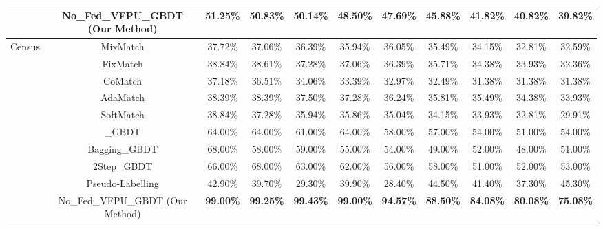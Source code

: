 \begin{table}[h]
{{\begin{tabular}{ccccccccccc}
				& No\_Fed\_VFPU\_GBDT (Our Method) & \textbf{51.25\%} & \textbf{50.83\%} & \textbf{50.14\%} & \textbf{48.50\%} & \textbf{47.69\%} & \textbf{45.88\%} & \textbf{41.82\%} & \textbf{40.82\%} & \textbf{39.82\%}  \\ 
				\hline
				\multirow{10}{*}{Census} & MixMatch                         & 37.72\%          & 37.06\%          & 36.39\%          & 35.94\%          & 36.05\%          & 35.49\%          & 34.15\%          & 32.81\%          & 32.59\%           \\
				& FixMatch                         & 38.84\%          & 38.61\%          & 37.28\%          & 37.06\%          & 36.39\%          & 35.71\%          & 34.38\%          & 33.93\%          & 32.36\%           \\
				& CoMatch                          & 37.18\%          & 36.51\%          & 34.06\%          & 33.39\%          & 32.97\%          & 32.49\%          & 31.38\%          & 31.38\%          & 31.38\%           \\
				& AdaMatch                         & 38.39\%          & 38.39\%          & 37.50\%          & 37.28\%          & 36.24\%          & 35.81\%          & 35.49\%          & 34.38\%          & 33.93\%           \\
				& SoftMatch                        & 38.84\%          & 37.28\%          & 35.94\%          & 35.86\%          & 35.04\%          & 34.15\%          & 33.93\%          & 32.81\%          & 29.91\%           \\
				& \_GBDT                           & 64.00\%          & 64.00\%          & 61.00\%          & 64.00\%          & 58.00\%          & 57.00\%          & 54.00\%          & 51.00\%          & 54.00\%           \\
				& Bagging\_GBDT                    & 68.00\%          & 58.00\%          & 59.00\%          & 55.00\%          & 54.00\%          & 49.00\%          & 52.00\%          & 48.00\%          & 51.00\%           \\
				& 2Step\_GBDT                      & 66.00\%          & 68.00\%          & 63.00\%          & 62.00\%          & 56.00\%          & 58.00\%          & 51.00\%          & 52.00\%          & 53.00\%           \\
				& Pseudo-Labelling                 & 42.90\%          & 39.70\%          & 29.30\%          & 39.90\%          & 28.40\%          & 44.50\%          & 41.40\%          & 37.30\%          & 45.30\%           \\
				& No\_Fed\_VFPU\_GBDT (Our Method) & \textbf{99.00\%} & \textbf{99.25\%} & \textbf{99.43\%} & \textbf{99.00\%} & \textbf{94.57\%} & \textbf{88.50\%} & \textbf{84.08\%} & \textbf{80.08\%} & \textbf{75.08\%}  \\
				\hline
			\end{tabular}
		}
	}
\end{table}